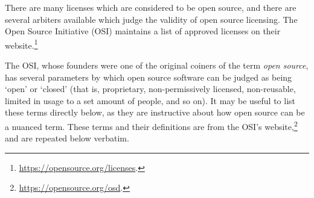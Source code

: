 There are many licenses which are considered to be open source, and there are several arbiters available which judge the validity of open source licensing. The Open Source Initiative (OSI) maintains a list of approved licenses on their website.\footnote{\href{https://opensource.org/licenses}{https://opensource.org/licenses}. }

The OSI, whose founders were one of the original coiners of the term {\it open source}, has several parameters by which open source software can be judged as being `open' or `closed' (that is, proprietary, non-permissively licensed, non-reusable, limited in usage to a set amount of people, and so on). It may be useful to list these terms directly below, as they are instructive about how open source can be a nuanced term. These terms and their definitions are from the OSI's website,\footnote{\href{https://opensource.org/osd}{https://opensource.org/osd}. } and are repeated below verbatim.

